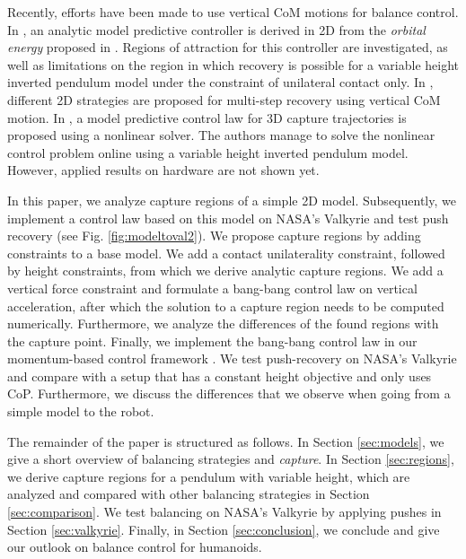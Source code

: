 \documentclass[letterpaper, 10 pt, conference]{ieeeconf}  %
\begin{document}
Recently, efforts have been made to use vertical CoM motions for balance control. In \cite{koolen2016balance}, an analytic model predictive controller is derived in 2D from the \textit{orbital energy} proposed in \cite{pratt2007derivation}. Regions of attraction for this controller are investigated, as well as limitations on the region in which recovery is possible for a variable height inverted pendulum model under the constraint of unilateral contact only. In \cite{gao2017increase}, different 2D strategies are proposed for multi-step recovery using vertical CoM motion. In \cite{caron2018balance}, a model predictive control law for 3D capture trajectories is proposed using a nonlinear solver. The authors manage to solve the nonlinear control problem online using a variable height inverted pendulum model. However, applied results on hardware are not shown yet. %

In this paper, we analyze capture regions of a simple 2D model. Subsequently, we implement a control law based on this model on NASA's Valkyrie and test push recovery (see Fig. \ref{fig:modeltoval2}). We propose capture regions by adding constraints to a base model. We add a contact unilaterality constraint, followed by height constraints, from which we derive analytic capture regions. We add a vertical force constraint and formulate a bang-bang control law on vertical acceleration, after which the solution to a capture region needs to be computed numerically. Furthermore, we analyze the differences of the found regions with the capture point. Finally, we implement the bang-bang control law in our momentum-based control framework \cite{koolen2016design}. We test push-recovery on NASA's Valkyrie \cite{radford2015valkyrie} and compare with a setup that has a constant height objective and only uses CoP. Furthermore, we discuss the differences that we observe when going from a simple model to the robot.

The remainder of the paper is structured as follows. In Section \ref{sec:models}, we give a short overview of balancing strategies  and \textit{capture}. In Section \ref{sec:regions}, we derive capture regions for a pendulum with variable height, which are analyzed and compared with other balancing strategies in Section \ref{sec:comparison}. We test balancing on NASA's Valkyrie by applying pushes in Section \ref{sec:valkyrie}. Finally, in Section \ref{sec:conclusion}, we conclude and give our outlook on balance control for humanoids.
\end{document}
